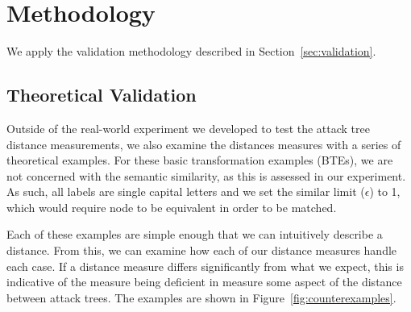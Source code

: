 \section{Methodology}
\label{sec:methodology}

We apply the validation methodology described in Section~\ref{sec:validation}.


\subsection{Theoretical Validation}
\label{ssec:methodology-examples}


Outside of the real-world experiment we developed to test the attack tree distance measurements, we also examine the distances measures with a series of theoretical examples. For these basic transformation examples (BTEs), we are not concerned with the semantic similarity,  as this is assessed in our experiment. As such, all labels are single capital letters and we set the similar limit ($\epsilon$) to 1, which would require node to be equivalent in order to be matched.

Each of these examples are simple enough that we can intuitively describe a distance. From this, we can examine how each of our distance measures handle each case. If a distance measure differs significantly from what we expect, this is indicative of the measure being deficient in measure some aspect of the distance between attack trees. The examples are shown in Figure~\ref{fig:counterexamples}.


